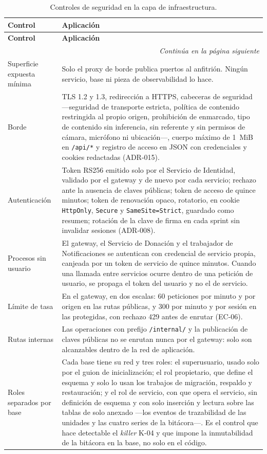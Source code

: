 \documentclass[11pt,a4paper]{article}
\newcommand{\contlinea}[1]{\multicolumn{#1}{r}{\footnotesize\itshape Continúa en la página siguiente}}
\begin{document}
\begin{longtable}{L{3.6cm} L{11.0cm}}
\caption{Controles de seguridad en la capa de infraestructura.}\label{tab:seginfra}\\
\toprule
\textbf{Control} & \textbf{Aplicación} \\
\midrule
\endfirsthead
\toprule
\textbf{Control} & \textbf{Aplicación} \\
\midrule
\endhead
\midrule
\contlinea{2} \\
\endfoot
\bottomrule
\endlastfoot
Superficie expuesta mínima & Solo el proxy de borde publica puertos al anfitrión. Ningún servicio, base ni pieza de observabilidad lo hace. \\
Borde & TLS 1.2 y 1.3, redirección a HTTPS, cabeceras de seguridad ---seguridad de transporte estricta, política de contenido restringida al propio origen, prohibición de enmarcado, tipo de contenido sin inferencia, sin referente y sin permisos de cámara, micrófono ni ubicación---, cuerpo máximo de 1~MiB en \texttt{/api/*} y registro de acceso en JSON con credenciales y cookies redactadas (ADR-015). \\
Autenticación & Token RS256 emitido solo por el Servicio de Identidad, validado por el gateway y de nuevo por cada servicio; rechazo ante la ausencia de claves públicas; token de acceso de quince minutos; token de renovación opaco, rotatorio, en cookie \texttt{HttpOnly}, \texttt{Secure} y \texttt{SameSite=Strict}, guardado como resumen; rotación de la clave de firma en cada sprint sin invalidar sesiones (ADR-008). \\
Procesos sin usuario & El gateway, el Servicio de Donación y el trabajador de Notificaciones se autentican con credencial de servicio propia, canjeada por un token de servicio de quince minutos. Cuando una llamada entre servicios ocurre dentro de una petición de usuario, se propaga el token del usuario y no el de servicio. \\
Límite de tasa & En el gateway, en dos escalas: 60 peticiones por minuto y por origen en las rutas públicas, y 300 por minuto y por sesión en las protegidas, con rechazo 429 antes de enrutar (EC-06). \\
Rutas internas & Las operaciones con prefijo \texttt{/internal/} y la publicación de claves públicas no se enrutan nunca por el gateway: solo son alcanzables dentro de la red de aplicación. \\
Roles separados por base & Cada base tiene su red y tres roles: el superusuario, usado solo por el guion de inicialización; el rol propietario, que define el esquema y solo lo usan los trabajos de migración, respaldo y restauración; y el rol de servicio, con que opera el servicio, sin definición de esquema y con solo inserción y lectura sobre las tablas de solo anexado ---los eventos de trazabilidad de las unidades y las cuatro series de la bitácora---. Es el control que hace detectable el \emph{killer} K-04 y que impone la inmutabilidad de la bitácora en la base, no solo en el código. \\

\end{longtable}
\end{document}
